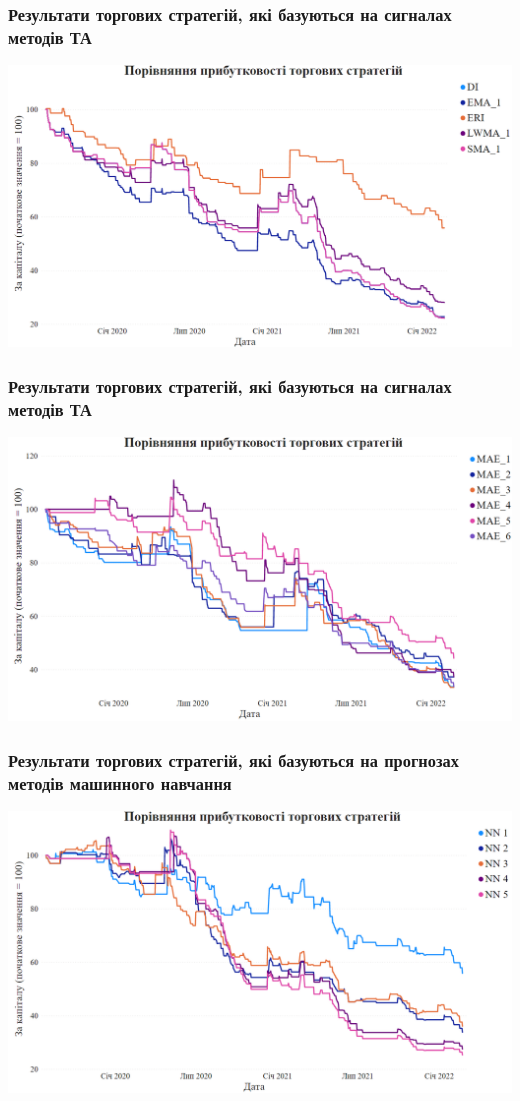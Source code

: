 \documentclass[aspectratio=169]{beamer}
\begin{document}
\begin{frame}
\frametitle{Результати торгових стратегій, які базуються на сигналах методів ТА}
\begin{center}
\includegraphics[scale=0.35]{Results Part 1.png}
\end{center}
\end{frame}

\begin{frame}
\frametitle{Результати торгових стратегій, які базуються на сигналах методів ТА}
\begin{center}
\includegraphics[scale=0.35]{Results Part 2.png}
\end{center}
\end{frame}

\begin{frame}
\frametitle{Результати торгових стратегій, які базуються на прогнозах методів машинного навчання}
\begin{center}
\includegraphics[scale=0.33]{Results Part 3.png}
\end{center}
\end{frame}
\end{document}

